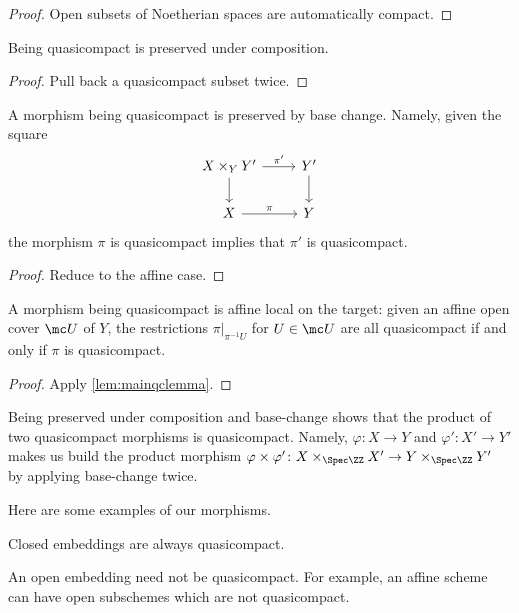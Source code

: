 \documentclass[../notes.tex]{subfiles}
\begin{document}
\begin{proof}
	Open subsets of Noetherian spaces are automatically compact.
\end{proof}
\begin{corollary}
	Being quasicompact is preserved under composition.
\end{corollary}
\begin{proof}
	Pull back a quasicompact subset twice.
\end{proof}
\begin{corollary}
	A morphism being quasicompact is preserved by base change. Namely, given the square
	\[\begin{tikzcd}
		{X\times_YY'} & {Y'} \\
		X & Y
		\arrow["\pi", from=2-1, to=2-2]
		\arrow["{\pi'}", from=1-1, to=1-2]
		\arrow[from=1-1, to=2-1]
		\arrow[from=1-2, to=2-2]
	\end{tikzcd}\]
	the morphism $\pi$ is quasicompact implies that $\pi'$ is quasicompact.
\end{corollary}
\begin{proof}
	Reduce to the affine case.
\end{proof}
\begin{corollary}
	A morphism being quasicompact is affine local on the target: given an affine open cover $\mc U$ of $Y$, the restrictions $\pi|_{\pi^{-1}U}$ for $U\in\mc U$ are all quasicompact if and only if $\pi$ is quasicompact.
\end{corollary}
\begin{proof}
	Apply \autoref{lem:mainqclemma}.
\end{proof}
\begin{remark}
	Being preserved under composition and base-change shows that the product of two quasicompact morphisms is quasicompact. Namely, $\varphi\colon X\to Y$ and $\varphi'\colon X'\to Y'$ makes us build the product morphism $\varphi\times\varphi'\colon X\times_{\Spec\ZZ}X'\to Y\times_{\Spec\ZZ}Y'$ by applying base-change twice.
\end{remark}
Here are some examples of our morphisms.
\begin{example}
	Closed embeddings are always quasicompact.
\end{example}
\begin{nex}
	An open embedding need not be quasicompact. For example, an affine scheme can have open subschemes which are not quasicompact.
\end{nex}
\end{document}
